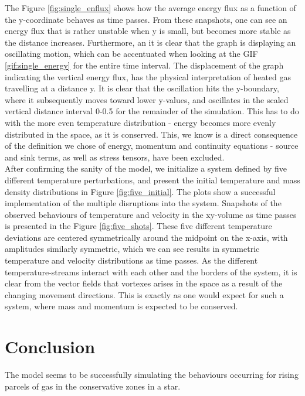 \documentclass[10pt, nofootinbib, twocolumn]{revtex4-1}
\begin{document}
The Figure \ref{fig:single_enflux} shows how the average energy flux as a function of the y-coordinate behaves as time passes. From these snapshots, one can see an energy flux that is rather unstable when y is small, but becomes more stable as the distance increases. Furthermore, an it is clear that the graph is displaying an oscillating motion, which can be accentuated when looking at the GIF \ref{gif:single_energy} for the entire time interval. The displacement of the graph indicating the vertical energy flux, has the physical interpretation of heated gas travelling at a distance y. It is clear that the oscillation hits the y-boundary, where it subsequently moves toward lower y-values, and oscillates in the scaled vertical distance interval 0-0.5 for the remainder of the simulation. This has to do with the more even temperature distribution - energy becomes more evenly distributed in the space, as it is conserved. This, we know is a direct consequence of the definition we chose of energy, momentum and continuity equations - source and sink terms, as well as stress tensors, have been excluded.  \\

After confirming the sanity of the model, we initialize a system defined by five different temperature perturbations, and present the initial temperature and mass density distributions in Figure \ref{fig:five_initial}. The plots show a successful implementation of the multiple disruptions into the system. Snapshots of the observed behaviours of temperature and velocity in the xy-volume as time passes is presented in the Figure \ref{fig:five_shots}. These five different temperature deviations are centered symmetrically around the midpoint on the x-axis, with amplitudes similarly symmetric, which we can see results in symmetric temperature and velocity distributions as time passes. As the different temperature-streams interact with each other and the borders of the system, it is clear from the vector fields that vortexes arises in the space as a result of the changing movement directions. This is exactly as one would expect for such a system, where mass and momentum is expected to be conserved. \\

\newpage
\section{Conclusion}
The model seems to be successfully simulating the behaviours occurring for rising parcels of gas in the conservative zones in a star. \\
\end{document}
